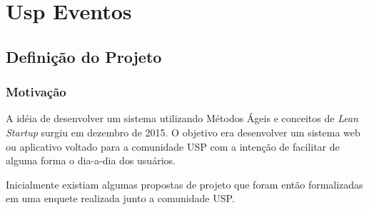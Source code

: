 \chapter{Usp Eventos}
\label{cap:uspeventos}
\section{Definição do Projeto}
\subsection{Motivação}
        \par A idéia de desenvolver um sistema utilizando Métodos Ágeis e conceitos de \emph{Lean Startup} surgiu em dezembro de 2015. O objetivo era desenvolver um sistema web ou aplicativo voltado para a comunidade USP com a intenção de facilitar de alguma forma o dia-a-dia dos usuários.
        \par Inicialmente existiam algumas propostas de projeto que foram então formalizadas em uma enquete realizada junto a comunidade USP.

